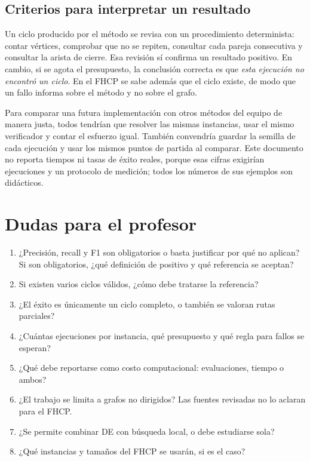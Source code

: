 \documentclass[letterpaper,12pt]{report}
\begin{document}
\subsection{Criterios para interpretar un resultado}
Un ciclo producido por el método se revisa con un procedimiento determinista: contar vértices, comprobar que no se repiten, consultar cada pareja consecutiva y consultar la arista de cierre. Esa revisión sí confirma un resultado positivo. En cambio, si se agota el presupuesto, la conclusión correcta es que \emph{esta ejecución no encontró un ciclo}. En el FHCP se sabe además que el ciclo existe, de modo que un fallo informa sobre el método y no sobre el grafo.

Para comparar una futura implementación con otros métodos del equipo de manera justa, todos tendrían que resolver las mismas instancias, usar el mismo verificador y contar el esfuerzo igual. También convendría guardar la semilla de cada ejecución y usar los mismos puntos de partida al comparar. Este documento no reporta tiempos ni tasas de éxito reales, porque esas cifras exigirían ejecuciones y un protocolo de medición; todos los números de sus ejemplos son didácticos.

\section{Dudas para el profesor}\label{sec:dudas}
\begin{enumerate}[leftmargin=*]
\item ¿Precisión, recall y F1 son obligatorios o basta justificar por qué no aplican? Si son obligatorios, ¿qué definición de positivo y qué referencia se aceptan?
\item Si existen varios ciclos válidos, ¿cómo debe tratarse la referencia?
\item ¿El éxito es únicamente un ciclo completo, o también se valoran rutas parciales?
\item ¿Cuántas ejecuciones por instancia, qué presupuesto y qué regla para fallos se esperan?
\item ¿Qué debe reportarse como costo computacional: evaluaciones, tiempo o ambos?
\item ¿El trabajo se limita a grafos no dirigidos? Las fuentes revisadas no lo aclaran para el FHCP.
\item ¿Se permite combinar DE con búsqueda local, o debe estudiarse sola?
\item ¿Qué instancias y tamaños del FHCP se usarán, si es el caso?
\end{enumerate}
\end{document}

